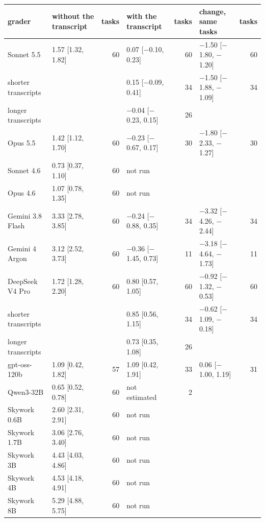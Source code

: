 {\scriptsize\setlength{\tabcolsep}{4pt}
\begin{tabular}{@{}llrlrlr@{}}
\toprule
grader & without the transcript & tasks & with the transcript & tasks & change, same tasks & tasks \\
\midrule
Sonnet 5.5 & 1.57 [1.32, 1.82] & 60 & 0.07 [$-$0.10, 0.23] & 60 & $-$1.50 [$-$1.80, $-$1.20] & 60 \\
\quad shorter transcripts &  &  & 0.15 [$-$0.09, 0.41] & 34 & $-$1.50 [$-$1.88, $-$1.09] & 34 \\
\quad longer transcripts &  &  & $-$0.04 [$-$0.23, 0.15] & 26 &  &  \\
Opus 5.5 & 1.42 [1.12, 1.70] & 60 & $-$0.23 [$-$0.67, 0.17] & 30 & $-$1.80 [$-$2.33, $-$1.27] & 30 \\
Sonnet 4.6 & 0.73 [0.37, 1.10] & 60 & not run &  &  &  \\
Opus 4.6 & 1.07 [0.78, 1.35] & 60 & not run &  &  &  \\
Gemini 3.8 Flash & 3.33 [2.78, 3.85] & 60 & $-$0.24 [$-$0.88, 0.35] & 34 & $-$3.32 [$-$4.26, $-$2.44] & 34 \\
Gemini 4 Argon & 3.12 [2.52, 3.73] & 60 & $-$0.36 [$-$1.45, 0.73] & 11 & $-$3.18 [$-$4.64, $-$1.73] & 11 \\
DeepSeek V4 Pro & 1.72 [1.28, 2.20] & 60 & 0.80 [0.57, 1.05] & 60 & $-$0.92 [$-$1.32, $-$0.53] & 60 \\
\quad shorter transcripts &  &  & 0.85 [0.56, 1.15] & 34 & $-$0.62 [$-$1.09, $-$0.18] & 34 \\
\quad longer transcripts &  &  & 0.73 [0.35, 1.08] & 26 &  &  \\
gpt-oss-120b & 1.09 [0.42, 1.82] & 57 & 1.09 [0.42, 1.91] & 33 & 0.06 [$-$1.00, 1.19] & 31 \\
Qwen3-32B & 0.65 [0.52, 0.78] & 60 & not estimated & 2 &  &  \\
\midrule
Skywork 0.6B & 2.60 [2.31, 2.91] & 60 & not run &  &  &  \\
Skywork 1.7B & 3.06 [2.76, 3.40] & 60 & not run &  &  &  \\
Skywork 3B & 4.43 [4.03, 4.86] & 60 & not run &  &  &  \\
Skywork 4B & 4.53 [4.18, 4.91] & 60 & not run &  &  &  \\
Skywork 8B & 5.29 [4.88, 5.75] & 60 & not run &  &  &  \\
\bottomrule
\end{tabular}}
